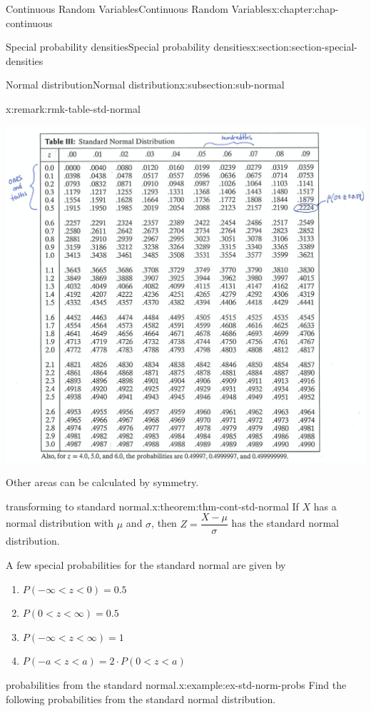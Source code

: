 \documentclass[oneside,10pt,]{book}
\numberwithin{equation}{section}
\newcommand{\lt}{<}
\begin{document}
\begin{chapterptx}{Continuous Random Variables}{}{Continuous Random Variables}{}{}{x:chapter:chap-continuous}
\begin{sectionptx}{Special probability densities}{}{Special probability densities}{}{}{x:section:section-special-densities}
\begin{subsectionptx}{Normal distribution}{}{Normal distribution}{}{}{x:subsection:sub-normal}
\begin{remark}{}{x:remark:rmk-table-std-normal}
\begin{figureptx}
\begin{image}{0.1}{0.8}{0.1}%
\includegraphics[width=\linewidth]{./images/ztab.png}
\end{image}%
\tcblower
\end{figureptx}%
Other areas can be calculated by symmetry.%
\end{remark}
\begin{theorem}{transforming to standard normal.}{}{x:theorem:thm-cont-std-normal}%
If \(X\) has a normal distribution with \(\mu\) and \(\sigma\), then \(\displaystyle Z = \dfrac{X - \mu}{\sigma}\) has the standard normal distribution.%
\end{theorem}
A few special probabilities for the standard normal are given by%
\begin{enumerate}
\item{}\(\displaystyle P(-\infty \lt z \lt 0) = 0.5\)%
\item{}\(\displaystyle P(0 \lt z \lt \infty) = 0.5\)%
\item{}\(\displaystyle P(-\infty \lt z \lt \infty) = 1\)%
\item{}\(\displaystyle P(-a \lt z \lt a) = 2\cdot P(0 \lt z \lt a)\)%
\end{enumerate}
%
\begin{example}{probabilities from the standard normal.}{x:example:ex-std-norm-probs}%
Find the following probabilities from the standard normal distribution.%
\begin{enumerate}

\end{enumerate}
\end{example}
\end{subsectionptx}
\end{sectionptx}
\end{chapterptx}
\end{document}

